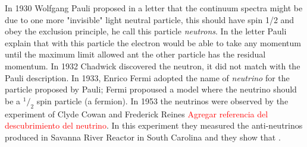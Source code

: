 In 1930 Wolfgang Pauli \cite{NeutrinoHistory} proposed in a letter that the continuum spectra might be due to one more "invisible" light neutral particle, this should have spin 1/2 and obey the exclusion principle, he call this particle \textit{neutrons}. In the letter Pauli explain that with this particle the electron would be able to take any momentum until the maximum limit allowed ant the other particle has the residual momentum. In 1932 Chadwick discovered the neutron, it did not match with the Pauli description. In 1933, Enrico Fermi adopted the name of \textit{neutrino} for the particle proposed by Pauli; Fermi propoused a model where the neutrino should be a $^1/_2$ spin particle (a fermion). In 1953 the neutrinos were observed by the experiment of Clyde Cowan and Frederick Reines \textcolor{red}{Agregar referencia del descubrimiento del neutrino}. In this experiment they measured the anti-neutrinos produced in Savanna River Reactor in South Carolina and they show that .




 

